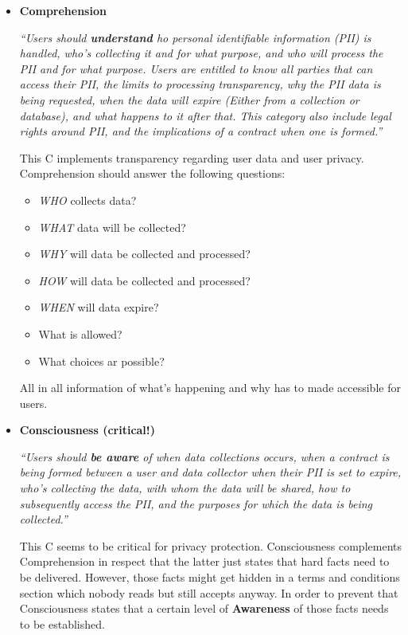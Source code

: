 \begin{itemize}


\item
\textbf{Comprehension}

\emph{``Users should \textbf{understand} ho personal identifiable
information (PII) is handled, who's collecting it and for what purpose,
and who will process the PII and for what purpose. Users are entitled
to know all parties that can access their PII, the limits to processing
transparency, why the PII data is being requested, when the data will
expire (Either from a collection or database), and what happens to it
after that. This category also include legal rights around PII, and the
implications of a contract when one is formed.''}

This C implements transparency regarding user data and user privacy.
Comprehension should answer the following questions:

\begin{itemize}

\item
  \emph{WHO} collects data?
\item
  \emph{WHAT} data will be collected?
\item
  \emph{WHY} will data be collected and processed?
\item
  \emph{HOW} will data be collected and processed?
\item
  \emph{WHEN} will data expire?
\item
  What is allowed?
\item
  What choices ar possible?
\end{itemize}

All in all information of what's happening and why has to made
accessible for users.

\item
\textbf{Consciousness \textbf{(critical!)}}

\emph{``Users should \textbf{be aware} of when data collections occurs,
when a contract is being formed between a user and data collector when
their PII is set to expire, who's collecting the data, with whom the
data will be shared, how to subsequently access the PII, and the
purposes for which the data is being collected.''}

This C seems to be critical for privacy protection. Consciousness
complements Comprehension in respect that the latter just states that
hard facts need to be delivered. However, those facts might get hidden
in a terms and conditions section which nobody reads but still accepts
anyway. In order to prevent that Consciousness states that a certain
level of \textbf{Awareness} of those facts needs to be established.


\end{itemize}
